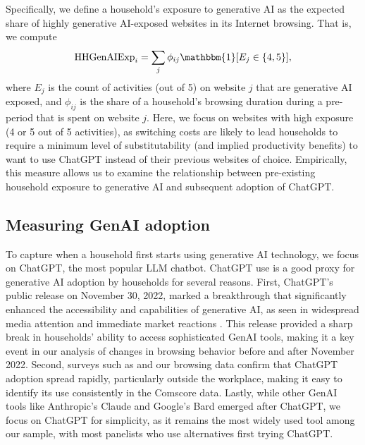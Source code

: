 \documentclass[12pt]{article}
\begin{document}
Specifically, we define a household's exposure to generative AI as the expected share of highly generative AI-exposed websites in its Internet browsing. That is, we compute
\begin{align} \label{eq:hhexposure}
    \text{HHGenAIExp}_i = \sum_j \phi_{ij} \mathbbm{1}[E_j \in \{4,5\}], 
\end{align}
where $E_j$ is the count of activities (out of 5) on website $j$ that are generative AI exposed, and $\phi_{ij}$ is the share of a household's browsing duration during a pre-period that is spent on website $j$. Here, we focus on websites with high exposure (4 or 5 out of 5 activities), as switching costs are likely to lead households to require a minimum level of substitutability (and implied productivity benefits) to want to use ChatGPT instead of their previous websites of choice.  Empirically, this measure allows us to examine the relationship between pre-existing household exposure to generative AI and subsequent adoption of ChatGPT.  





\subsection{Measuring GenAI adoption}

To capture when a household first starts using generative AI technology, we focus on ChatGPT, the most popular LLM chatbot. ChatGPT use is a good proxy for generative AI adoption by households for several reasons. First, ChatGPT’s public release on November 30, 2022, marked a breakthrough that significantly enhanced the accessibility and capabilities of generative AI, as seen in widespread media attention and immediate market reactions \citep{eisfeldt2023}. This release provided a sharp break in households' ability to access sophisticated GenAI tools, making it a key event in our analysis of changes in browsing behavior before and after November 2022. Second, surveys such as \cite{bick2024} and our browsing data confirm that ChatGPT adoption spread rapidly, particularly outside the workplace, making it easy to identify its use consistently in the Comscore data. Lastly, while other GenAI tools like Anthropic’s Claude and Google’s Bard emerged after ChatGPT, we focus on ChatGPT for simplicity, as it remains the most widely used tool among our sample, with most panelists who use alternatives first trying ChatGPT.
\end{document}
